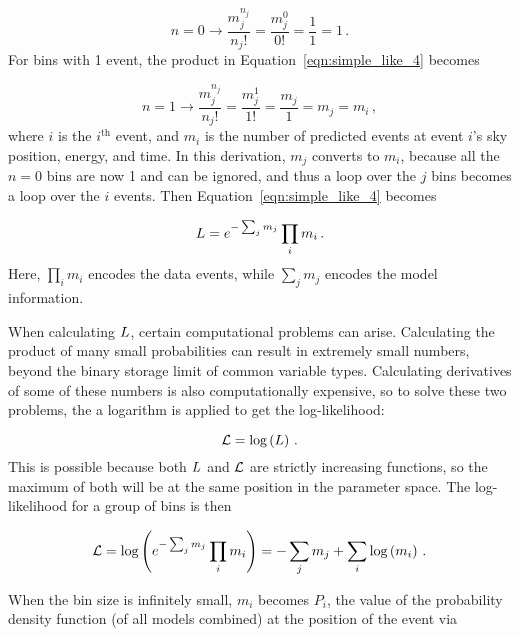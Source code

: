 \begin{equation}\label{eqn:simple_like_4a}
  n=0 \rightarrow \frac{m_j^{n_j}}{n_j!} = \frac{m_j^{0}}{0!} = \frac{1}{1} = 1 \,.
\end{equation}
For bins with 1 event, the product in Equation~\ref{eqn:simple_like_4} becomes

\begin{equation}\label{eqn:simple_like_4b}
  n=1 \rightarrow \frac{m_j^{n_j}}{n_j!} = \frac{m_j^1}{1!} = \frac{m_j}{1} = m_j = m_i \,,
\end{equation}
where $i$ is the $i^{\textrm{th}}$ event, and $m_i$ is the number of predicted events at event $i$'s sky position, energy, and time.
In this derivation, $m_j$ converts to $m_i$, because all the $n=0$ bins are now 1 and can be ignored, and thus a loop over the $j$ bins becomes a loop over the $i$ events.
Then Equation~\ref{eqn:simple_like_4} becomes

\begin{equation}\label{eqn:simple_like_5}
  L = e^{- \sum_j m_j} \prod_i m_i \,.
\end{equation}
Here, $\prod_i m_i$ encodes the data events, while $\sum_j m_{j}$ encodes the model information.

When calculating $L$, certain computational problems can arise.
Calculating the product of many small probabilities can result in extremely small numbers, beyond the binary storage limit of common variable types.
Calculating derivatives of some of these numbers is also computationally expensive, so to solve these two problems, the a logarithm is applied to get the log-likelihood:

\begin{equation}\label{eqn:simple_like_6}
  \mathcal{L} = \textrm{log} \left ( L \right )  \,.
\end{equation}
This is possible because both $L$ and $\mathcal{L}$ are strictly increasing functions, so the maximum of both will be at the same position in the parameter space.
The log-likelihood for a group of bins is then

\begin{equation}\label{eqn:simple_like_7}
  \mathcal{L} = \textrm{log} \left ( e^{- \sum_j m_j} \prod_i m_i \right ) = - \sum_j m_j + \sum_i \textrm{log} \left ( m_i \right ) \,.
\end{equation}

When the bin size is infinitely small, $m_i$ becomes $P_i$, the value of the probability density function (of all models combined) at the position of the event via

